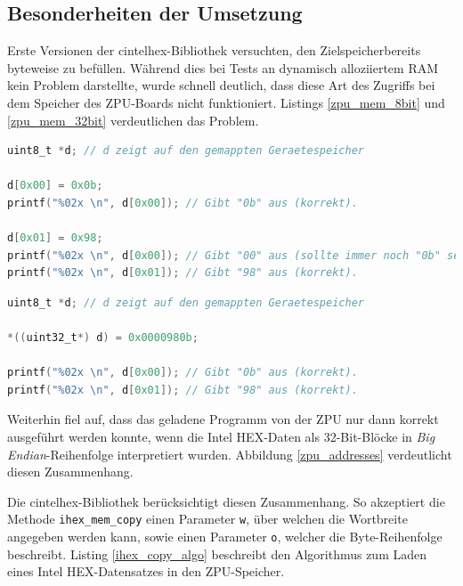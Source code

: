\documentclass[11pt]{scrartcl}
\begin{document}
\subsection{Besonderheiten der Umsetzung}

Erste Versionen der cintelhex-Bibliothek versuchten, den Zielspeicherbereits byteweise zu befüllen. Während dies bei Tests an dynamisch alloziiertem RAM kein Problem darstellte, wurde schnell deutlich, dass diese Art des Zugriffs bei dem Speicher des ZPU-Boards nicht funktioniert. Listings \ref{zpu_mem_8bit} und \ref{zpu_mem_32bit} verdeutlichen das Problem.

\begin{lstlisting}[float=p,language=C,caption=Unerwartetes Verhalten des ZPU-Speichers bei 8-Bit-Zugriff,morekeywords={uint8_t,uint32_t},label=zpu_mem_8bit]
uint8_t *d; // d zeigt auf den gemappten Geraetespeicher

d[0x00] = 0x0b;
printf("%02x \n", d[0x00]); // Gibt "0b" aus (korrekt).

d[0x01] = 0x98;
printf("%02x \n", d[0x00]); // Gibt "00" aus (sollte immer noch "0b" sein)!
printf("%02x \n", d[0x01]); // Gibt "98" aus (korrekt).
\end{lstlisting}

\begin{lstlisting}[float=p,language=C,caption=Korrektes Verhalten des ZPU-Speichers bei 32-Bit-Zugriff,morekeywords={uint8_t,uint32_t},label=zpu_mem_32bit]
uint8_t *d; // d zeigt auf den gemappten Geraetespeicher

*((uint32_t*) d) = 0x0000980b;

printf("%02x \n", d[0x00]); // Gibt "0b" aus (korrekt).
printf("%02x \n", d[0x01]); // Gibt "98" aus (korrekt).
\end{lstlisting}

Weiterhin fiel auf, dass das geladene Programm von der ZPU nur dann korrekt ausgeführt werden konnte, wenn die Intel HEX-Daten als 32-Bit-Blöcke in \emph{Big Endian}-Reihenfolge interpretiert wurden. Abbildung  \ref{zpu_addresses} verdeutlicht diesen Zusammenhang.

Die cintelhex-Bibliothek berücksichtigt diesen Zusammenhang. So akzeptiert die Methode \texttt{ihex\_mem\_copy} einen Parameter \texttt{w}, über welchen die Wortbreite angegeben werden kann, sowie einen Parameter \texttt{o}, welcher die Byte-Reihenfolge beschreibt. Listing \ref{ihex_copy_algo} beschreibt den Algorithmus zum Laden eines Intel HEX-Datensatzes in den ZPU-Speicher.
\end{document}
